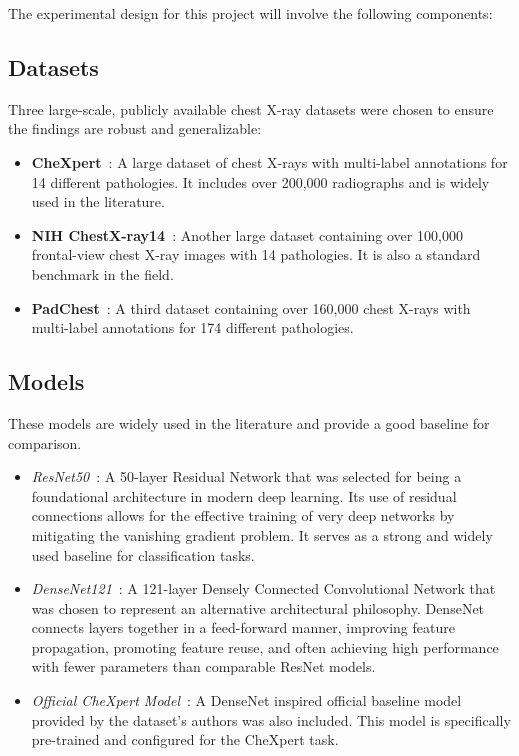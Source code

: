 The experimental design for this project will involve the following components:

\subsection{Datasets}

Three large-scale, publicly available chest X-ray datasets were chosen
to ensure the findings are robust and generalizable:
\begin{itemize}
    \item \textbf{CheXpert}~\cite{irvin2019chexpert}:
    A large dataset of chest X-rays with multi-label annotations for 14 different pathologies.
    It includes over 200,000 radiographs and is widely used in the literature.

    \item \textbf{NIH ChestX-ray14}~\cite{wang2017chestxray}:
    Another large dataset containing over 100,000 frontal-view chest X-ray images
    with 14 pathologies. It is also a standard benchmark in the field.

    \item \textbf{PadChest}~\cite{Bustos2020padchest}:
    A third dataset containing over 160,000 chest X-rays
    with multi-label annotations for 174 different pathologies.
\end{itemize}

\subsection{Models}

These models are widely used in the literature and provide a good baseline for comparison.

\begin{itemize}
    \item \emph{ResNet50}~\cite{he2015resnet}:
    A 50-layer Residual Network that was selected for being
    a foundational architecture in modern deep learning.
    Its use of residual connections allows for the effective training of very deep networks
    by mitigating the vanishing gradient problem.
    It serves as a strong and widely used baseline for classification tasks.

    \item \emph{DenseNet121}~\cite{huang2017densenet}:
    A 121-layer Densely Connected Convolutional Network that was chosen
    to represent an alternative architectural philosophy.
    DenseNet connects layers together in a feed-forward manner,
    improving feature propagation, promoting feature reuse, and often achieving
    high performance with fewer parameters than comparable ResNet models.

    \item \emph{Official CheXpert Model}~\cite{irvin2019chexpert}:
    A DenseNet inspired official baseline model provided by the dataset's authors was also included.
    This model is specifically pre-trained and configured for the CheXpert task.
\end{itemize}

